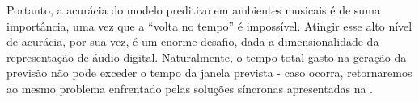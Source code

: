 Portanto, a acurácia do modelo preditivo em ambientes musicais é de suma importância, uma vez que a ``volta no tempo'' é impossível. Atingir esse alto nível de acurácia, por sua vez, é um enorme desafio, dada a dimensionalidade da representação de áudio digital. Naturalmente, o tempo total gasto na geração da previsão não pode exceder o tempo da janela prevista - caso ocorra, retornaremos ao mesmo problema enfrentado pelas soluções síncronas apresentadas na .





